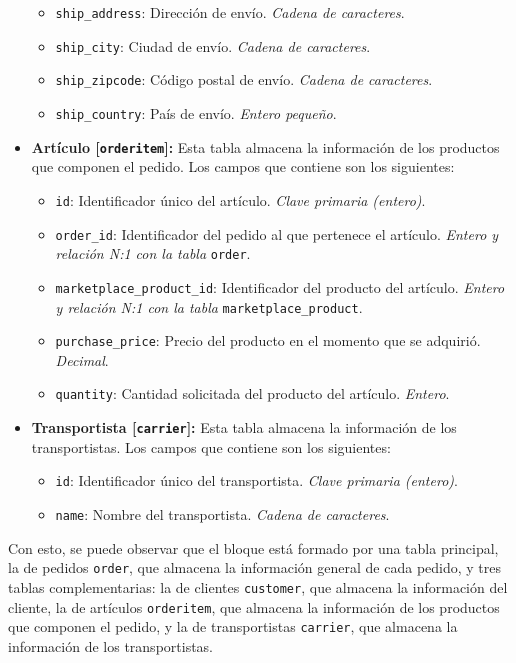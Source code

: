 \begin{itemize}
\begin{itemize}
              \item \texttt{ship\_address}: Dirección de envío. \textit{Cadena de caracteres}.
              \item \texttt{ship\_city}: Ciudad de envío. \textit{Cadena de caracteres}.
              \item \texttt{ship\_zipcode}: Código postal de envío. \textit{Cadena de caracteres}.
              \item \texttt{ship\_country}: País de envío. \textit{Entero pequeño}.
          \end{itemize}
    \item \textbf{Artículo [\texttt{orderitem}]:} Esta tabla almacena la información de los productos que componen el pedido. Los campos que contiene son los siguientes:
          \begin{itemize}
              \item \texttt{id}: Identificador único del artículo. \textit{Clave primaria (entero)}.
              \item \texttt{order\_id}: Identificador del pedido al que pertenece el artículo. \textit{Entero y relación N:1 con la tabla} \texttt{order}.
              \item \texttt{marketplace\_product\_id}: Identificador del producto del artículo. \textit{Entero y relación N:1 con la tabla} \texttt{marketplace\_product}.
              \item \texttt{purchase\_price}: Precio del producto en el momento que se adquirió. \textit{Decimal}.
              \item \texttt{quantity}: Cantidad solicitada del producto del artículo. \textit{Entero}.
          \end{itemize}
    \item \textbf{Transportista [\texttt{carrier}]:} Esta tabla almacena la información de los transportistas. Los campos que contiene son los siguientes:
          \begin{itemize}
              \item \texttt{id}: Identificador único del transportista. \textit{Clave primaria (entero)}.
              \item \texttt{name}: Nombre del transportista. \textit{Cadena de caracteres}.
          \end{itemize}
\end{itemize}

Con esto, se puede observar que el bloque está formado por una tabla principal, la de pedidos \texttt{order}, que almacena la información general de cada pedido, y tres tablas complementarias: la de clientes \texttt{customer}, que almacena la información del cliente, la de artículos \texttt{orderitem}, que almacena la información de los productos que componen el pedido, y la de transportistas \texttt{carrier}, que almacena la información de los transportistas.

